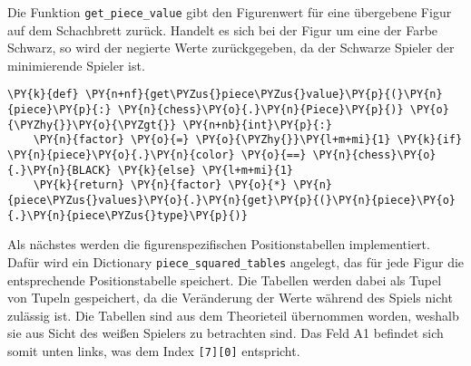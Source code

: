     Die Funktion \texttt{get\_piece\_value} gibt den Figurenwert für eine
übergebene Figur auf dem Schachbrett zurück. Handelt es sich bei der
Figur um eine der Farbe Schwarz, so wird der negierte Werte
zurückgegeben, da der Schwarze Spieler der minimierende Spieler ist.

\bigskip

    \begin{tcolorbox}[fontupper=\linespread{.66}\selectfont, breakable, size=fbox, boxrule=1pt, pad at break*=1mm,colback=cellbackground, colframe=cellborder]
\begin{Verbatim}[commandchars=\\\{\}]
\PY{k}{def} \PY{n+nf}{get\PYZus{}piece\PYZus{}value}\PY{p}{(}\PY{n}{piece}\PY{p}{:} \PY{n}{chess}\PY{o}{.}\PY{n}{Piece}\PY{p}{)} \PY{o}{\PYZhy{}}\PY{o}{\PYZgt{}} \PY{n+nb}{int}\PY{p}{:}
    \PY{n}{factor} \PY{o}{=} \PY{o}{\PYZhy{}}\PY{l+m+mi}{1} \PY{k}{if} \PY{n}{piece}\PY{o}{.}\PY{n}{color} \PY{o}{==} \PY{n}{chess}\PY{o}{.}\PY{n}{BLACK} \PY{k}{else} \PY{l+m+mi}{1}
    \PY{k}{return} \PY{n}{factor} \PY{o}{*} \PY{n}{piece\PYZus{}values}\PY{o}{.}\PY{n}{get}\PY{p}{(}\PY{n}{piece}\PY{o}{.}\PY{n}{piece\PYZus{}type}\PY{p}{)}
\end{Verbatim}
\end{tcolorbox}

    Als nächstes werden die figurenspezifischen Positionstabellen
implementiert. Dafür wird ein Dictionary \texttt{piece\_squared\_tables}
angelegt, das für jede Figur die entsprechende Positionstabelle
speichert. Die Tabellen werden dabei als Tupel von Tupeln gespeichert,
da die Veränderung der Werte während des Spiels nicht zulässig ist. Die
Tabellen sind aus dem Theorieteil übernommen worden, weshalb sie aus
Sicht des weißen Spielers zu betrachten sind. Das Feld A1 befindet sich
somit unten links, was dem Index \texttt{{[}7{]}{[}0{]}} entspricht.

\bigskip

